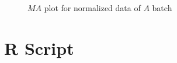 \documentclass{article}
\begin{document}
\begin{figure}[h!]
\centerline{}
\caption{$MA$ plot for normalized data of $A$ batch}
\label{fig:rmaplot}
\end{figure}


\clearpage
\section{R Script}
\end{document}
